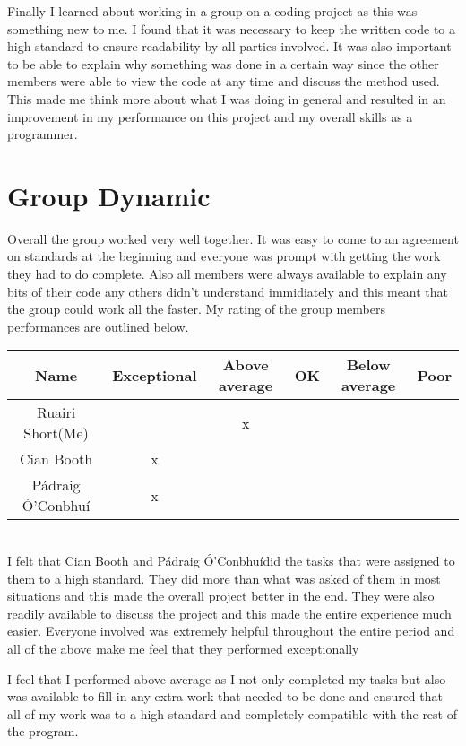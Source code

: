 \documentclass[12pt]{article}    %
\numberwithin{equation}{section}
\newcommand{\pa}{P\'{a}draig \'{O}'Conbhu\'{i}}
\begin{document}
Finally I learned about working in a group on a coding project as this was something new to me.
I found that it was necessary to keep the written code to a high standard to ensure readability by all parties involved.
It was also important to be able to explain why something was done in a certain way since the other members were able to view the code at any time and discuss the method used.
This made me think more about what I was doing in general and resulted in an improvement in my performance on this project and my overall skills as a programmer.


\section{Group Dynamic}
Overall the group worked very well together. 
It was easy to come to an agreement on standards at the beginning and everyone was prompt with getting the work they had to do complete.
Also all members were always available to explain any bits of their code any others didn't understand immidiately and this meant that the group could work all the faster.
My rating of the group members performances are outlined below.

\begin{tabular}{|c|c|c|c|c|c|}
\hline
Name & Exceptional & Above average & OK & Below average & Poor\\
\hline\hline
Ruairi Short(Me) & & x& & &\\ 
\hline
Cian Booth & x& & & &\\
\hline
\pa & x& & & &\\
\hline
\end{tabular}
\\
I felt that Cian Booth and \pa did the tasks that were assigned to them to a high standard.
They did more than what was asked of them in most situations and this made the overall project better in the end.
They were also readily available to discuss the project and this made the entire experience much easier.
Everyone involved was extremely helpful throughout the entire period and all of the above make me feel that they performed exceptionally

I feel that I performed above average as I not only completed my tasks but also was available to fill in any extra work that needed to be done and ensured that all of my work was to a high standard and completely compatible with the rest of the program.
\end{document}
